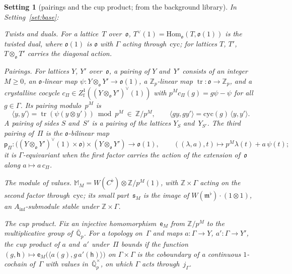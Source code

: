 \documentclass[11pt,a4paper]{article}
\newcommand{\kw}[1]{\emph{#1}}
\newcommand{\m}[1]{\mbox{$#1$}}        %
\theoremstyle{plainx}
\theoremstyle{uprightx}
\newtheorem{setting}[theorem]{Setting}          %
\providecommand{\Zp}{\mathbb{Z}_p}\providecommand{\Qp}{\mathbb{Q}_p}\providecommand{\GQp}{G_{\mathbb{Q}_p}}
\providecommand{\Ainf}{A_{\inf}}\providecommand{\WC}{W(C^{\flat})}\providecommand{\BdR}{B_{\mathrm{dR}}}
\providecommand{\fo}{\mathfrak{o}}\providecommand{\fc}{\mathfrak{c}}\providecommand{\fd}{\mathfrak{d}}
\begin{document}
\begin{setting}[pairings and the cup product; from the background library]\label{set:pair}
In Setting~\ref{set:base}:

\emph{Twists and duals.} For a lattice~$T$ over~$\fo$, $T^{\vee}(1)=\mathrm{Hom}_{\fo}(T,\fo(1))$ is the twisted
dual, where \m{\fo(1)} is $\fo$ with $\Gamma$ acting through~$\mathrm{cyc}$; for lattices $T$, $T'$,
\m{T\otimes_{\fo}T'} carries the diagonal action.

\emph{Pairings.} For lattices $Y$, $Y'$ over~$\fo$, a \kw{pairing} of $Y$ and~$Y'$ consists of an integer
\m{M\ge0}, an $\fo$-linear map $\psi\colon Y\otimes_{\fo}Y'\to\fo(1)$, a $\Zp$-linear map
$\operatorname{tr}\colon\fo\to\Zp$, and a crystalline cocycle
$c_\Pi\in Z^{1}_{\mathrm{f}}((Y\otimes_{\fo}Y')^{\vee}(1))$ with \m{p^{M}c_\Pi(g)=g\psi-\psi} for all
\m{g\in\Gamma}. Its \kw{pairing modulo~$p^{M}$} is
\[\langle y,y'\rangle=\operatorname{tr}(\psi(y\otimes y'))\bmod p^{M}\ \in\ \mathbb{Z}/p^{M},\qquad
\langle gy,gy'\rangle=\mathrm{cyc}(g)\,\langle y,y'\rangle .\]
A \kw{pairing of sides} $S$ and~$S'$ is a pairing of the lattices $Y_S$ and~$Y_{S'}$. The
\kw{third pairing} of~$\Pi$ is the $\fo$-bilinear map
\[\mathsf{p}_\Pi\colon\bigl((Y\otimes_{\fo}Y')^{\vee}(1)\times\fo\bigr)\times(Y\otimes_{\fo}Y')\to\fo(1),\qquad
((\lambda,a),t)\mapsto p^{M}\lambda(t)+a\,\psi(t);\]
it is $\Gamma$-equivariant when the first factor carries the action of the extension of~$\fo$ along
\m{a\mapsto a\,c_\Pi}.

\emph{The module of values.} $\mathbb{M}_M=\WC\otimes\mathbb{Z}/p^{M}(1)$, with \m{\mathbb{Z}\times\Gamma}
acting on the second factor through~$\mathrm{cyc}$; its \kw{small part}~$\mathfrak{s}_M$ is the image of
$W(\mathfrak{m}^\flat)\cdot(1\otimes1)$, an $\Ainf$-submodule stable under \m{\mathbb{Z}\times\Gamma}.

\emph{The cup product.} Fix an injective homomorphism~$\mathsf{e}_M$ from \m{\mathbb{Z}/p^{M}} to the
multiplicative group of~$\bar{\mathbb{Q}}_p$. For a topology on~$\Gamma$ and maps \m{a\colon\Gamma\to Y},
\m{a'\colon\Gamma\to Y'}, the \kw{cup product of $a$ and~$a'$ under~$\Pi$ bounds} if the function
$(g,\mathsf{h})\mapsto\mathsf{e}_M\bigl(\langle a(g),g\,a'(\mathsf{h})\rangle\bigr)$ on \m{\Gamma\times\Gamma} is the coboundary of a
continuous $1$-cochain of~$\Gamma$ with values in~$\bar{\mathbb{Q}}_p^{\times}$, on which $\Gamma$ acts
through~$j_\Gamma$.
\end{setting}
\end{document}
